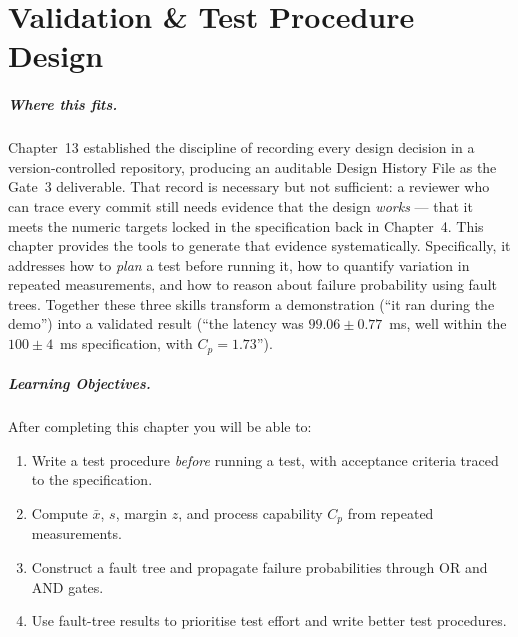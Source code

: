 
\chapter{Validation \& Test Procedure Design}
\label{ch14}

\paragraph{Where this fits.}
Chapter~13 established the discipline of recording every design decision in a version-controlled
repository, producing an auditable Design History File as the Gate~3 deliverable.
That record is necessary but not sufficient: a reviewer who can trace every commit still needs
evidence that the design \emph{works} --- that it meets the numeric targets locked in the
specification back in Chapter~4.
This chapter provides the tools to generate that evidence systematically.
Specifically, it addresses how to \emph{plan} a test before running it, how to quantify
variation in repeated measurements, and how to reason about failure probability using fault trees.
Together these three skills transform a demonstration (``it ran during the demo'') into a
validated result (``the latency was $99.06 \pm 0.77$~ms, well within the $100 \pm 4$~ms
specification, with $C_p = 1.73$'').

\paragraph{Learning Objectives.}
After completing this chapter you will be able to:
\begin{enumerate}
  \item Write a test procedure \emph{before} running a test, with acceptance criteria traced
        to the specification.
  \item Compute $\bar{x}$, $s$, margin $z$, and process capability $C_p$ from repeated
        measurements.
  \item Construct a fault tree and propagate failure probabilities through OR and AND gates.
  \item Use fault-tree results to prioritise test effort and write better test procedures.
\end{enumerate}


